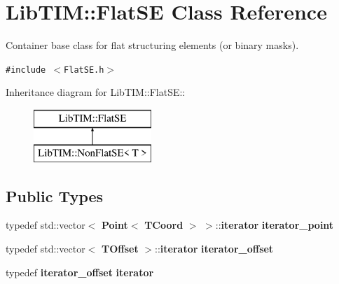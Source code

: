 \section{Lib\-TIM::Flat\-SE Class Reference}
\label{classLibTIM_1_1FlatSE}
Container base class for flat structuring elements (or binary masks).  


{\tt \#include $<$Flat\-SE.h$>$}

Inheritance diagram for Lib\-TIM::Flat\-SE::\begin{figure}[H]
\begin{center}
\leavevmode
\includegraphics[height=2cm]{classLibTIM_1_1FlatSE}
\end{center}
\end{figure}
\subsection*{Public Types}
\begin{CompactItemize}
\item 
typedef std::vector$<$ {\bf Point}$<$ {\bf TCoord} $>$ $>$::{\bf iterator} {\bf iterator\_\-point}
\item 
typedef std::vector$<$ {\bf TOffset} $>$::{\bf iterator} {\bf iterator\_\-offset}
\item 
typedef {\bf iterator\_\-offset} {\bf iterator}
\end{CompactItemize}
